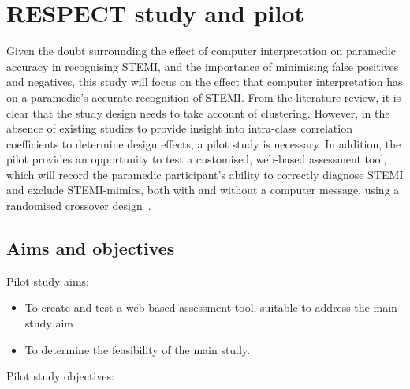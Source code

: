 \chapter{RESPECT study and pilot}
\label{respectstudyandpilot}


Given the doubt surrounding the effect of computer interpretation on paramedic accuracy in recognising STEMI, and the importance of minimising false positives and negatives, this study will focus on the effect that computer interpretation has on a paramedic's accurate recognition of STEMI. From the literature review, it is clear that the study design needs to take account of clustering. However, in the absence of existing studies to provide insight into intra-class correlation coefficients to determine design effects, a pilot study is necessary. In addition, the pilot provides an opportunity to test a customised, web-based assessment tool, which will record the paramedic participant's ability to correctly diagnose STEMI and exclude STEMI-mimics, both with and without a computer message, using a randomised crossover design~\citep{arain_what_2010}. 

\section{Aims and objectives}
\label{aimsandobjectives}

Pilot study aims: 

\begin{itemize}
\item To create and test a web-based assessment tool, suitable to address the main study aim

\item To determine the feasibility of the main study.

\end{itemize}

 \clearpage 

Pilot study objectives:

